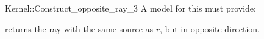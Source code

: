 \begin{ccRefFunctionObjectConcept}{Kernel::Construct_opposite_ray_3}
A model for this must provide:


{returns the ray with the same source as $r$, but in opposite direction.}

\ccIsModel{}

\end{ccRefFunctionObjectConcept}

